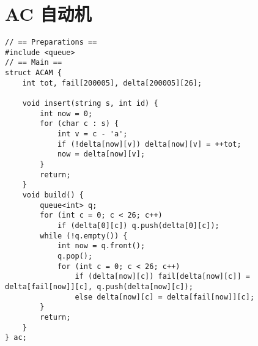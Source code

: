 \section{AC 自动机}

\begin{verbatim}
// == Preparations ==
#include <queue>
// == Main ==
struct ACAM {
    int tot, fail[200005], delta[200005][26];

    void insert(string s, int id) {
        int now = 0;
        for (char c : s) {
            int v = c - 'a';
            if (!delta[now][v]) delta[now][v] = ++tot;
            now = delta[now][v];
        }
        return;
    }
    void build() {
        queue<int> q;
        for (int c = 0; c < 26; c++)
            if (delta[0][c]) q.push(delta[0][c]);
        while (!q.empty()) {
            int now = q.front();
            q.pop();
            for (int c = 0; c < 26; c++)
                if (delta[now][c]) fail[delta[now][c]] = delta[fail[now]][c], q.push(delta[now][c]);
                else delta[now][c] = delta[fail[now]][c];
        }
        return;
    }
} ac;
\end{verbatim}